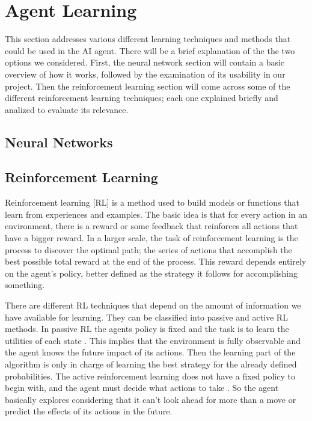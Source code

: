 \section{Agent Learning}\label{agent_learning}
This section addresses various different learning techniques and methods that could be used in the AI agent. There will be a brief explanation of the the two options we considered. First, the neural network section will contain a basic overview of how it works, followed by the examination of its usability in our project. Then the reinforcement learning section will come across some of the different reinforcement learning techniques;  each one explained briefly and analized to evaluate its relevance. 

\subsection*{Neural Networks}			 
			


\subsection*{Reinforcement Learning}

Reinforcement learning  [RL] is a method used to build models or functions that learn from experiences and examples. The basic idea is that for every action in an environment, there is a reward or some feedback that reinforces all actions that have a bigger reward. In a larger scale, the task of reinforcement learning is the process to discover the optimal path; the series of actions that accomplish the best possible total reward at the end of the process. This reward depends entirely on the agent's policy, better defined as the strategy it follows for accomplishing something. 

There are different RL techniques that depend on the amount of information we have available for learning. They can be classified into passive and active RL methods. In passive RL the agents policy is fixed and the task is to learn the utilities of each state \cite[p764]{rl}. This implies that the environment is fully observable and the agent knows the future impact of its actions. Then the learning part of the algorithm is only in charge of learning the best strategy for the already defined probabilities. The active reinforcement learning does not have a fixed policy to begin with, and the agent must decide what actions to take \cite[p771]{rl}. So the agent basically explores considering that it can't look ahead for more than a move or predict the effects of its actions in the future. 

